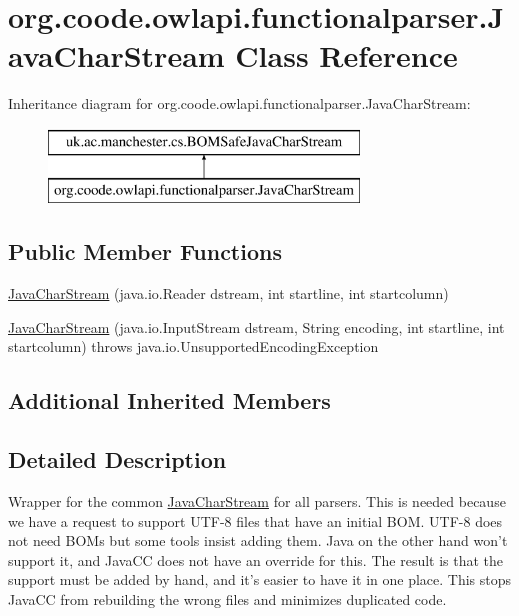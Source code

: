\hypertarget{classorg_1_1coode_1_1owlapi_1_1functionalparser_1_1_java_char_stream}{\section{org.\-coode.\-owlapi.\-functionalparser.\-Java\-Char\-Stream Class Reference}
\label{classorg_1_1coode_1_1owlapi_1_1functionalparser_1_1_java_char_stream}
}
Inheritance diagram for org.\-coode.\-owlapi.\-functionalparser.\-Java\-Char\-Stream\-:\begin{figure}[H]
\begin{center}
\leavevmode
\includegraphics[height=2.000000cm]{classorg_1_1coode_1_1owlapi_1_1functionalparser_1_1_java_char_stream}
\end{center}
\end{figure}
\subsection*{Public Member Functions}
\begin{DoxyCompactItemize}
\item 
\hyperlink{classorg_1_1coode_1_1owlapi_1_1functionalparser_1_1_java_char_stream_a06e2ec9a841dbf06c085bae1dab3acf2}{Java\-Char\-Stream} (java.\-io.\-Reader dstream, int startline, int startcolumn)
\item 
\hyperlink{classorg_1_1coode_1_1owlapi_1_1functionalparser_1_1_java_char_stream_abc6cdc550418bcda075a0c12ff5f11c3}{Java\-Char\-Stream} (java.\-io.\-Input\-Stream dstream, String encoding, int startline, int startcolumn)  throws java.\-io.\-Unsupported\-Encoding\-Exception 
\end{DoxyCompactItemize}
\subsection*{Additional Inherited Members}


\subsection{Detailed Description}
Wrapper for the common \hyperlink{classorg_1_1coode_1_1owlapi_1_1functionalparser_1_1_java_char_stream}{Java\-Char\-Stream} for all parsers. This is needed because we have a request to support U\-T\-F-\/8 files that have an initial B\-O\-M. U\-T\-F-\/8 does not need B\-O\-Ms but some tools insist adding them. Java on the other hand won't support it, and Java\-C\-C does not have an override for this. The result is that the support must be added by hand, and it's easier to have it in one place. This stops Java\-C\-C from rebuilding the wrong files and minimizes duplicated code. 


